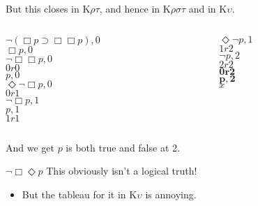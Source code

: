 \documentclass[
  14pt,
  letterpaper,
  ignorenonframetext,
]{beamer}
\providecommand{\tightlist}{%
  \setlength{\itemsep}{0pt}\setlength{\parskip}{0pt}}\usepackage{longtable,booktabs,array}
\begin{document}
\begin{frame}
But this closes in K\(\rho \tau\), and hence in K\(\rho \sigma \tau\)
and in K\(\upsilon\).

\begin{columns}[T]
\begin{column}{0.65\textwidth}
\begin{center}
$\neg(\Box p \supset \Box \Box p), 0$ \\
$\Box p, 0$ \\
$\neg \Box \Box p, 0$ \\
$0r0$ \\
$p, 0$ \\
$\Diamond \neg \Box p, 0$ \\
$0r1$ \\
$\neg \Box p, 1$ \\
$p, 1$ \\
$1r1$ \\
\end{center}
\end{column}

\begin{column}{0.35\textwidth}
\begin{center}
$\Diamond \neg p, 1$ \\
$1r2$ \\
$\neg p, 2$ \\
$2r2$ \\
$\mathbf{0r2}$ \\
$\mathbf{p, 2}$ \\
$x$
\end{center}
\end{column}
\end{columns}

And we get \(p\) is both true and false at 2.
\end{frame}

\begin{frame}{\(\neg \Box \Diamond p\)}
\protect\hypertarget{neg-box-diamond-p}{}
This obviously isn't a logical truth!

\begin{itemize}
\tightlist
\item
  But the tableau for it in K\(\upsilon\) is annoying.
\end{itemize}
\end{frame}
\end{document}
